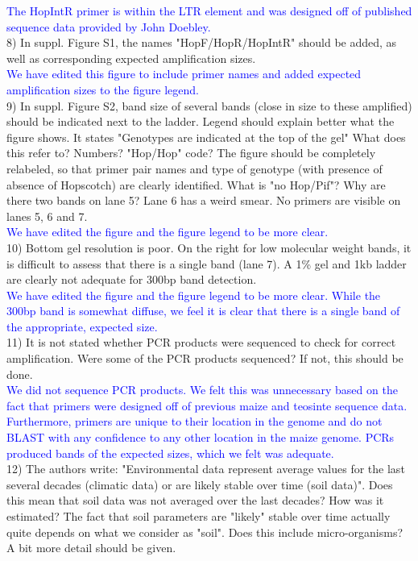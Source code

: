 \documentclass[11pt]{article}
\newcommand{\res}[1]{\noindent \textcolor{blue}{{#1}} \\}
\begin{document}
\res{The HopIntR primer is within the LTR element and was designed off of published sequence data provided by John Doebley.}

8) In suppl. Figure S1, the names "HopF/HopR/HopIntR" should be added, as well as corresponding expected amplification sizes.\\

\res{We have edited this figure to include primer names and added expected amplification sizes to the figure legend.}

9) In suppl. Figure S2, band size of several bands (close in size to these amplified) should be indicated next to the ladder. Legend should explain better what the figure shows. It states "Genotypes are indicated at the top of the gel" What does this refer to? Numbers? "Hop/Hop" code? The figure should be completely relabeled, so that primer pair names and type of genotype (with presence of absence of Hopscotch) are clearly identified. What is "no Hop/Pif"? Why are there two bands on lane 5? Lane 6 has a weird smear. No primers are visible on lanes 5, 6 and 7.\\

\res{We have edited the figure and the figure legend to be more clear.}

10) Bottom gel resolution is poor. On the right for low molecular weight bands, it is difficult to assess that there is a single band (lane 7). A 1\% gel and 1kb ladder are clearly not adequate for 300bp band detection.\\

\res{We have edited the figure and the figure legend to be more clear.  While the 300bp band is somewhat diffuse, we feel it is clear that there is a single band of the appropriate, expected size.}

11) It is not stated whether PCR products were sequenced to check for correct amplification. Were some of the PCR products sequenced? If not, this should be done.\\

\res{We did not sequence PCR products. We felt this was unnecessary based on the fact that primers were designed off of previous maize and teosinte sequence data. Furthermore, primers are unique to their location in the genome and do not BLAST with any confidence to any other location in the maize genome. PCRs produced bands of the expected sizes, which we felt was adequate.}

12) The authors write: "Environmental data represent average values for the last several decades (climatic data) or are likely stable over time (soil data)". Does this mean that soil data was not averaged over the last decades? How was it estimated? The fact that soil parameters are "likely" stable over time actually quite depends on what we consider as "soil". Does this include micro-organisms? A bit more detail should be given.\\
\end{document}
